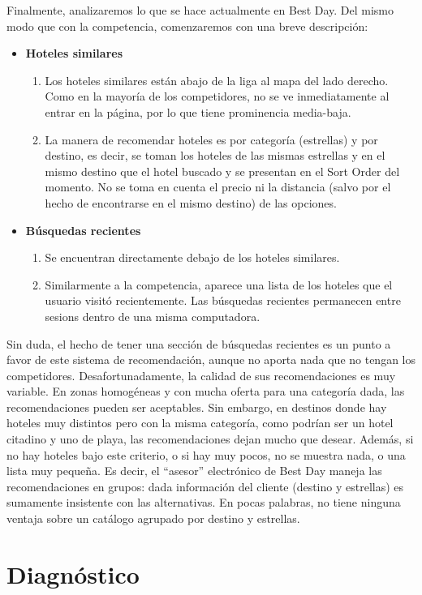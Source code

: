 \documentclass[12pt]{report}
\begin{document}
Finalmente, analizaremos lo que se hace actualmente en Best Day. Del mismo modo que con la competencia, comenzaremos con una breve descripción:
\begin{itemize}
	\item \textbf{Hoteles similares}
	\begin{enumerate}
		\item Los hoteles similares están abajo de la liga al mapa del lado derecho. Como en la mayoría de los competidores, no se ve inmediatamente al entrar en la página, por lo que tiene prominencia media-baja.
		\item La manera de recomendar hoteles es por categoría (estrellas) y por destino, es decir, se toman los hoteles de las mismas estrellas y en el mismo destino que el hotel buscado y se presentan en el Sort Order del momento. No se toma en cuenta el precio ni la distancia (salvo por el hecho de encontrarse en el mismo destino) de las opciones.
	\end{enumerate}
	\item \textbf{Búsquedas recientes}
	\begin{enumerate}
		\item Se encuentran directamente debajo de los hoteles similares.
		\item Similarmente a la competencia, aparece una lista de los hoteles que el usuario visitó recientemente. Las búsquedas recientes permanecen entre \glspl{sesion} dentro de una misma computadora.
	\end{enumerate}
\end{itemize}
Sin duda, el hecho de tener una sección de búsquedas recientes es un punto a favor de este sistema de recomendación, aunque no aporta nada que no tengan los competidores. Desafortunadamente, la calidad de sus recomendaciones es muy variable. En zonas homogéneas y con mucha oferta para una categoría dada, las recomendaciones pueden ser aceptables. Sin embargo, en destinos donde hay hoteles muy distintos pero con la misma categoría, como podrían ser un hotel citadino y uno de playa, las recomendaciones dejan mucho que desear. Además, si no hay hoteles bajo este criterio, o si hay muy pocos, no se muestra nada, o una lista muy pequeña. Es decir, el ``asesor'' electrónico de Best Day maneja las recomendaciones en grupos: dada información del cliente (destino y estrellas) es sumamente insistente con las alternativas. En pocas palabras, no tiene ninguna ventaja sobre un catálogo agrupado por destino y estrellas.

\section{Diagnóstico}
\end{document}
